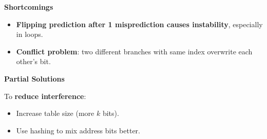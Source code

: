 \highspace
\begin{flushleft}
    \textcolor{Red2}{ \textbf{Shortcomings}}
\end{flushleft}
\begin{itemize}[label=\textcolor{Red2}{}]
    \item \textbf{Flipping prediction after 1 misprediction causes instability}, especially in loops.
    \item \textbf{Conflict problem}: two different branches with same index overwrite each other's bit.
\end{itemize}

\highspace
\begin{flushleft}
    \textcolor{Green3}{ \textbf{Partial Solutions}}
\end{flushleft}
To \textbf{reduce interference}:
\begin{itemize}
    \item Increase table size (more $k$ bits).
    \item Use hashing to mix address bits better.
\end{itemize}

